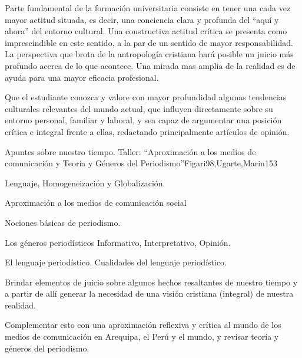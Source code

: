 \begin{syllabus}


\begin{justification}
Parte fundamental de la formación universitaria consiste en tener una cada vez mayor actitud situada, es decir, una conciencia clara y profunda del ``aquí y ahora'' del entorno cultural.  Una constructiva actitud crítica se presenta como imprescindible en este sentido, a la par de un sentido de mayor responsabilidad.  La perspectiva que brota de la antropología cristiana hará posible un juicio más profundo acerca de lo que acontece.  Una mirada mas amplia de la realidad es de ayuda para una mayor eficacia profesional.
\end{justification}

\begin{goals}
\item Que el estudiante conozca y valore con mayor profundidad algunas tendencias culturales relevantes del mundo actual, que influyen directamente sobre su entorno personal, familiar y laboral, y sea capaz de argumentar una posición crítica e integral frente a ellas, redactando principalmente artículos de opinión.
\end{goals}

\begin{outcomes}
\end{outcomes}

\begin{unit}{Apuntes sobre nuestro tiempo. Taller: ``Aproximación a los medios de comunicación y Teoría y Géneros del Periodismo''}{Figari98,Ugarte,Marin}{15}{3}
\begin{topics}
	\item Lenguaje, Homogeneización y Globalización
	\item Aproximación a los medios de comunicación social
	\item Nociones básicas de periodismo.
	\item Los géneros periodísticos Informativo, Interpretativo, Opinión.
	\item El lenguaje periodístico. Cualidades del lenguaje periodístico.
\end{topics}
\begin{unitgoals}
	\item Brindar elementos de juicio sobre algunos hechos resaltantes de nuestro tiempo y a partir de allí generar la necesidad de una visión cristiana (integral) de nuestra realidad. 	
	\item Complementar esto con una aproximación reflexiva y crítica al mundo de los medios de comunicación en Arequipa, el Perú y el mundo, y revisar teoría y géneros del periodismo.
\end{unitgoals}
\end{unit}


\end{syllabus}
